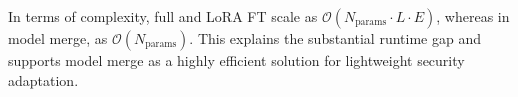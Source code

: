 \documentclass[conference,compsoc]{IEEEtran}
\begin{document}
In terms of complexity, full and LoRA FT scale as $\mathcal{O}(N_{\text{params}}\cdot L\cdot E)$, whereas in model merge, as $\mathcal{O}(N_{\text{params}})$. This explains the substantial runtime gap and supports model merge as a highly efficient solution for lightweight security adaptation.





\end{document}
